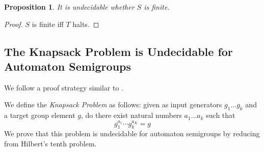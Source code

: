 \documentclass[10pt,a4paper]{article} %
\theoremstyle{pleasant}
\newtheorem{proposition}{Proposition}
\newcommand{\defn}[1]{\textit{#1}}
\begin{document}
    \begin{proposition}
    It is undecidable whether $S$ is finite.
    \end{proposition}
    \begin{proof}
    $S$ is finite iff $T$ halts.
    \end{proof}

    \subsection{The Knapsack Problem is Undecidable for Automaton Semigroups} 
    We follow a proof strategy similar to \cite{Konig15:knapsack}.

    We define the \defn{Knapsack Problem} as follows: given as input generators $g_1 \ldots g_k$ and a target group element $g$, do there exist natural numbers $a_1\ldots a_k$ such that 
    \[ g_1^{a_1} \cdots g_k^{a_K} = g \]
    We prove that this problem is undecidable for automaton semigroups by reducing from %
    Hilbert's tenth problem.


    
\end{document}
